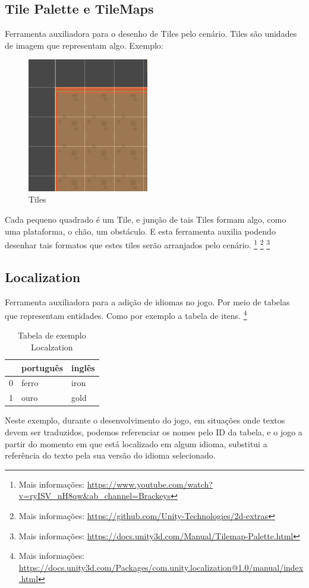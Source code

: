 \subsection{Tile Palette e TileMaps}
Ferramenta auxiliadora para o desenho de Tiles pelo cenário. Tiles são unidades de imagem que representam algo. Exemplo: 
\begin{figure}[!h]
    \centering
    \includegraphics[width=200px]{figuras/tiles.png}
    \caption{Tiles}
    \label{fig_tiles}
\end{figure}
Cada pequeno quadrado é um Tile, e junção de tais Tiles formam algo, como uma plataforma, o chão, um obstáculo. E esta ferramenta auxilia podendo desenhar tais formatos que estes tiles serão arranjados pelo cenário. 
\footnote{Mais informações: \url{https://www.youtube.com/watch?v=ryISV_nH8qw&ab_channel=Brackeys}} 
\footnote{Mais informações: \url{https://github.com/Unity-Technologies/2d-extras}}
\footnote{Mais informações: \url{https://docs.unity3d.com/Manual/Tilemap-Palette.html}}

\subsection{Localization}
Ferramenta auxiliadora para a adição de idiomas no jogo. Por meio de tabelas que representam entidades. Como por exemplo a tabela de itens. \footnote{Mais informações: \url{https://docs.unity3d.com/Packages/com.unity.localization@1.0/manual/index.html}}
\begin{table}[h]
    \centering
    \begin{tabular}{|l|l|l|}
        \hline
          & português        & inglês      \\ \hline
        0 & ferro            & iron        \\ \hline
        1 & ouro             & gold        \\ \hline
    \end{tabular}
\caption{Tabela de exemplo Localzation}
\label{table:localization}
\end{table}
Neste exemplo, durante o desenvolvimento do jogo, em situações onde textos devem ser traduzidos, podemos referenciar os nomes pelo ID da tabela, e o jogo a partir do momento em que está localizado em algum idioma, substitui a referência do texto pela sua versão do idioma selecionado.

